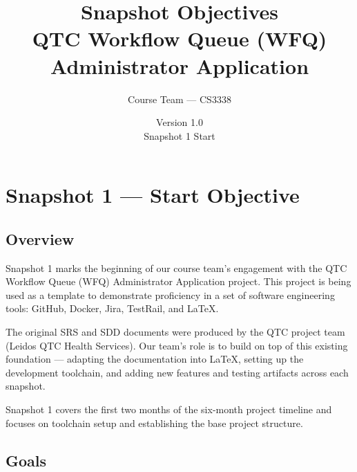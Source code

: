 \documentclass[12pt]{article}
\title{Snapshot Objectives\\
\large QTC Workflow Queue (WFQ) Administrator Application}
\author{Course Team --- CS3338}
\date{Version 1.0 \\ Snapshot 1 Start}
\begin{document}
\maketitle
\newpage

\tableofcontents
\newpage

\section{Snapshot 1 — Start Objective}

\subsection{Overview}
Snapshot 1 marks the beginning of our course team's engagement with the QTC Workflow Queue
(WFQ) Administrator Application project. This project is being used as a template to
demonstrate proficiency in a set of software engineering tools: GitHub, Docker, Jira,
TestRail, and LaTeX.

The original SRS and SDD documents were produced by the QTC project team (Leidos QTC Health
Services). Our team's role is to build on top of this existing foundation --- adapting the
documentation into LaTeX, setting up the development toolchain, and adding new features and
testing artifacts across each snapshot.

Snapshot 1 covers the first two months of the six-month project timeline and focuses on
toolchain setup and establishing the base project structure.

\subsection{Goals}
\end{document}
